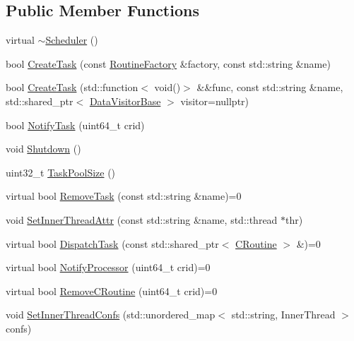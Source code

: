 \subsection*{Public Member Functions}
\begin{DoxyCompactItemize}
\item 
virtual \hyperlink{classapollo_1_1cyber_1_1scheduler_1_1Scheduler_a019767c67f63ccafb798b2d3d5e18971}{$\sim$\-Scheduler} ()
\item 
bool \hyperlink{classapollo_1_1cyber_1_1scheduler_1_1Scheduler_ad744c26058750fc922c5d4003a7040d7}{Create\-Task} (const \hyperlink{classapollo_1_1cyber_1_1croutine_1_1RoutineFactory}{Routine\-Factory} \&factory, const std\-::string \&name)
\item 
bool \hyperlink{classapollo_1_1cyber_1_1scheduler_1_1Scheduler_a5765c94bc9a038eb55172fc0ee95ac0c}{Create\-Task} (std\-::function$<$ void()$>$ \&\&func, const std\-::string \&name, std\-::shared\-\_\-ptr$<$ \hyperlink{classapollo_1_1cyber_1_1data_1_1DataVisitorBase}{Data\-Visitor\-Base} $>$ visitor=nullptr)
\item 
bool \hyperlink{classapollo_1_1cyber_1_1scheduler_1_1Scheduler_a624a4d8b6e3fa9af97abf24f2b86e8c1}{Notify\-Task} (uint64\-\_\-t crid)
\item 
void \hyperlink{classapollo_1_1cyber_1_1scheduler_1_1Scheduler_a6a33fdc12c1b99936dd0ab23767569ac}{Shutdown} ()
\item 
uint32\-\_\-t \hyperlink{classapollo_1_1cyber_1_1scheduler_1_1Scheduler_acb9cf2b49454c6a9ca75437e07473015}{Task\-Pool\-Size} ()
\item 
virtual bool \hyperlink{classapollo_1_1cyber_1_1scheduler_1_1Scheduler_ad605b692e0e776ab95a19fa2ea0229e7}{Remove\-Task} (const std\-::string \&name)=0
\item 
void \hyperlink{classapollo_1_1cyber_1_1scheduler_1_1Scheduler_ab74d2a01e6376d39016ae519fafa6f7c}{Set\-Inner\-Thread\-Attr} (const std\-::string \&name, std\-::thread $\ast$thr)
\item 
virtual bool \hyperlink{classapollo_1_1cyber_1_1scheduler_1_1Scheduler_a71ac4be0a8f632a931a92680eb935774}{Dispatch\-Task} (const std\-::shared\-\_\-ptr$<$ \hyperlink{classapollo_1_1cyber_1_1croutine_1_1CRoutine}{C\-Routine} $>$ \&)=0
\item 
virtual bool \hyperlink{classapollo_1_1cyber_1_1scheduler_1_1Scheduler_abfcfe864b071e5c7d1a5a80706c11671}{Notify\-Processor} (uint64\-\_\-t crid)=0
\item 
virtual bool \hyperlink{classapollo_1_1cyber_1_1scheduler_1_1Scheduler_aeebbc8587d53f187d46016100fb67dc5}{Remove\-C\-Routine} (uint64\-\_\-t crid)=0
\item 
void \hyperlink{classapollo_1_1cyber_1_1scheduler_1_1Scheduler_ae41a1dfeb9a7e7f2662e0fb1063903f7}{Set\-Inner\-Thread\-Confs} (std\-::unordered\-\_\-map$<$ std\-::string, Inner\-Thread $>$ confs)
\end{DoxyCompactItemize}
